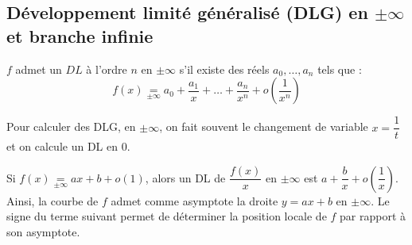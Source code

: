     \subsection{Développement limité généralisé (DLG) en $\pm \infty$ et branche infinie}

        $f$ admet un $DL$ à l'ordre $n$ en $\pm \infty$ s'il existe des réels $a_0, \dots, a_n$ tels que :\\
        \[f(x) \underset{\pm \infty}{=} a_0 + \frac{a_1}{x} + \dots + \frac{a_n}{x^n} + o\left(\frac{1}{x^n}\right)\]

        Pour calculer des DLG, en $\pm \infty$, on fait souvent le changement de variable $x = \dfrac{1}{t}$ et on calcule un DL en $0$.

        Si $f(x) \underset{\pm \infty}{=} ax + b + o(1)$, alors un DL de $\dfrac{f(x)}{x}$ en $\pm \infty$ est $a + \dfrac{b}{x} + o\left(\dfrac{1}{x}\right)$.\\

        Ainsi, la courbe de $f$ admet comme asymptote la droite $y = ax + b$ en $\pm \infty$.
        Le signe du terme suivant permet de déterminer la position locale de $f$ par rapport à son asymptote.
